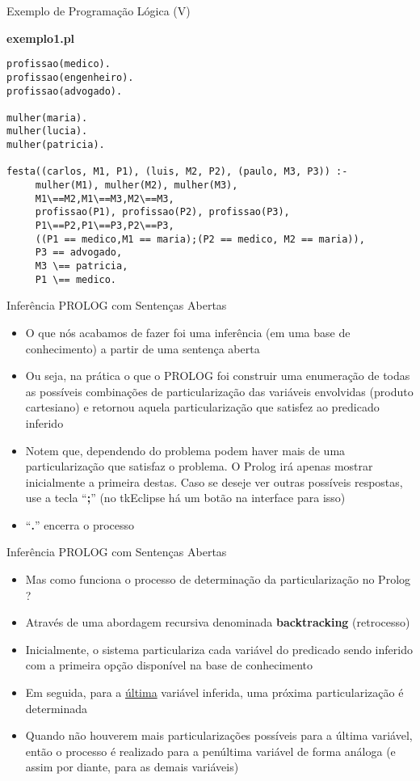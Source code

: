 \begin{frame}[fragile]{Exemplo de Programação Lógica (V)}
\begin{center}
{\bf exemplo1.pl}
\end{center}

\begin{scriptsize}
\begin{lstlisting}
profissao(medico).
profissao(engenheiro).
profissao(advogado).

mulher(maria).
mulher(lucia).
mulher(patricia).

festa((carlos, M1, P1), (luis, M2, P2), (paulo, M3, P3)) :-
     mulher(M1), mulher(M2), mulher(M3),
     M1\==M2,M1\==M3,M2\==M3,
     profissao(P1), profissao(P2), profissao(P3),
     P1\==P2,P1\==P3,P2\==P3,
     ((P1 == medico,M1 == maria);(P2 == medico, M2 == maria)),
     P3 == advogado,
     M3 \== patricia,
     P1 \== medico.	
\end{lstlisting}
\end{scriptsize}
\end{frame}

\begin{frame}[t]{Inferência PROLOG com Sentenças Abertas}
	\begin{itemize}
	\item O que nós acabamos de fazer foi uma inferência (em uma base de conhecimento) a partir de uma sentença aberta
	\item Ou seja, na prática o que o PROLOG foi construir uma enumeração de todas as possíveis combinações de particularização das variáveis envolvidas (produto cartesiano) e retornou aquela particularização que satisfez ao predicado inferido
	\item Notem que, dependendo do problema podem haver mais de uma particularização que satisfaz o problema. O Prolog irá apenas mostrar inicialmente a primeira destas. Caso se deseje ver outras possíveis respostas, use a tecla ``{\bf ;}'' (no tkEclipse há um botão na interface para isso)
	\item ``{\bf .}'' encerra o processo
	\end{itemize}
\end{frame}

\begin{frame}[t]{Inferência PROLOG com Sentenças Abertas}
	\begin{itemize}
	\item Mas como funciona o processo de determinação da particularização no Prolog ?
	\item Através de uma abordagem recursiva denominada {\bf backtracking} (retrocesso)
	\item Inicialmente, o sistema particulariza cada variável do predicado sendo inferido com a primeira opção disponível na base de conhecimento
	\item Em seguida, para a \underline{última} variável inferida, uma próxima particularização é determinada
	\item Quando não houverem mais particularizações possíveis para a última variável, então o processo é realizado para a penúltima variável de forma análoga (e assim por diante, para as demais variáveis)
	\end{itemize}
\end{frame}

